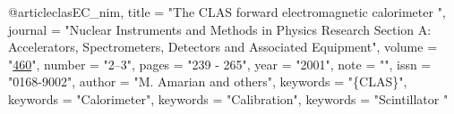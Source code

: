 @article{clasEC_nim,
title = "{The {CLAS} forward electromagnetic calorimeter }",
journal = "{Nuclear Instruments and Methods in Physics Research Section A: Accelerators, Spectrometers, Detectors and Associated Equipment}",
volume = "\href{http://www.sciencedirect.com/science/article/pii/S0168900200009967}{460}",
number = "2–3",
pages = "239 - 265",
year = "2001",
note = "",
issn = "0168-9002",
author = "M. Amarian and others",
keywords = "\{CLAS\}",
keywords = "Calorimeter",
keywords = "Calibration",
keywords = "Scintillator "
}

